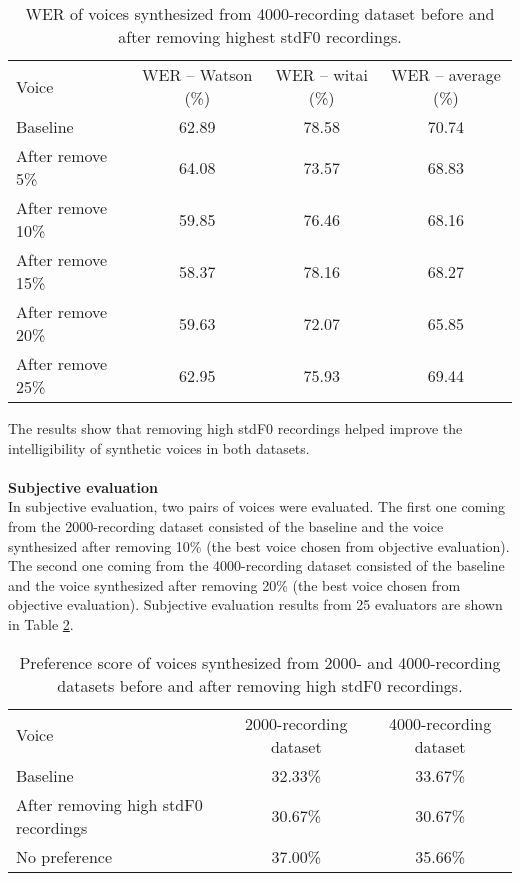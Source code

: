 \documentclass[12pt]{article}
\begin{document}
\begin{table}[]
\begin{center}
\caption{WER of voices synthesized from 4000-recording dataset before and after removing highest stdF0 recordings.}
\label{tab_werStdF04000}
\vspace{3mm}
\begin{tabular}{lccc}
\hline
Voice & WER – Watson (\%) & WER – witai (\%) & WER – average (\%)\\
\cmidrule(l{0pt}r{2pt}){1-1}\cmidrule(l{0pt}r{2pt}){2-2}\cmidrule(l{0pt}r{2pt}){3-3}\cmidrule(l{0pt}r{2pt}){4-4}
Baseline          & 62.89 & 78.58 & 70.74 \\
After remove 5\%  & 64.08 & 73.57 & 68.83 \\
After remove 10\% & 59.85 & 76.46 & 68.16 \\
After remove 15\% & 58.37 & 78.16 & 68.27 \\
After remove 20\% & 59.63 & 72.07 & 65.85 \\
After remove 25\% & 62.95 & 75.93 & 69.44 \\
\hline
\end{tabular}
\end{center}
\end{table}

The results show that removing high stdF0 recordings helped improve the intelligibility of synthetic voices in both datasets.\\\\
\textbf{Subjective evaluation}
\vspace{0.28cm}\\
In subjective evaluation, two pairs of voices were evaluated. The first one coming from the 2000-recording dataset consisted of the baseline and the voice synthesized after removing 10\% (the best voice chosen from objective evaluation). The second one coming from the 4000-recording dataset consisted of the baseline and the voice synthesized after removing 20\% (the best voice chosen from objective evaluation). Subjective evaluation results from 25 evaluators are shown in Table \ref{tab_subEvaStsF0}.

\begin{table}[]
\begin{center}
\caption{Preference score of voices synthesized from 2000- and 4000-recording datasets before and after removing high stdF0 recordings.}
\label{tab_subEvaStsF0}
\vspace{3mm}
\begin{tabular}{lcc}
\hline
Voice & 2000-recording dataset & 4000-recording dataset \\
\cmidrule(l{0pt}r{2pt}){1-1}\cmidrule(l{0pt}r{2pt}){2-2}\cmidrule(l{0pt}r{2pt}){3-3}
Baseline & 32.33\% & 33.67\% \\
After removing high stdF0 recordings & 30.67\% & 30.67\% \\
No preference & 37.00\% & 35.66\% \\
\hline
\end{tabular}
\end{center}
\end{table}
\end{document}
